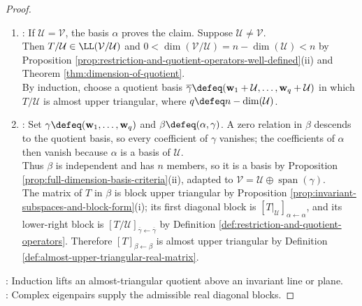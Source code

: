 \begin{theorem}
\begin{proof}
\begin{enumerate}[label=(\roman*)]
\begin{enumerate}[label=(\alph*)]
If $\mathbf{v}=c\mathbf{u}$ with $c\in\mathbb{R}$, then $c(a-bc)\mathbf{u}=cT\mathbf{u}=T\mathbf{v}=(b+ac)\mathbf{u}$ by linearity and the component identities.\\
Thus $c^2=-1$ by $\mathbf{u}\neq\mathbf{0}$ and $b\neq0$, a contradiction. Therefore $\mathbf{u},\mathbf{v}$ are independent.\\
Set $\mathcal{U}\defeq\operatorname{span}(\mathbf{u},\mathbf{v})$ and $\alpha\defeq(\mathbf{u},-\mathbf{v})$. Then $\mathcal{U}\in\operatorname{Inv}(T)$ and $[T|_{\mathcal{U}}]_{\alpha\leftarrow\alpha}=\left[\begin{smallmatrix}a&-b\\b&a\end{smallmatrix}\right]$ by the component identities.
\end{enumerate}
In both cases, $\dim(\mathcal{U})\in\{1,2\}$ and the matrix of $T|_{\mathcal{U}}$ in $\alpha$ is an admissible first diagonal block.
\item {}: If $\mathcal{U}=\mathcal{V}$, the basis $\alpha$ proves the claim. Suppose $\mathcal{U}\neq\mathcal{V}$.\\
Then $T/\mathcal{U}\in\LL(\mathcal{V}/\mathcal{U})$ and $0<\dim(\mathcal{V}/\mathcal{U})=n-\dim(\mathcal{U})<n$ by Proposition \ref{prop:restriction-and-quotient-operators-well-defined}(ii) and Theorem \ref{thm:dimension-of-quotient}.\\
By induction, choose a quotient basis $\overline{\gamma}\defeq(\mathbf{w}_1+\mathcal{U},\ldots,\mathbf{w}_q+\mathcal{U})$ in which $T/\mathcal{U}$ is almost upper triangular, where $q\defeq n-\dim(\mathcal{U})$.
\item {}: Set $\gamma\defeq(\mathbf{w}_1,\ldots,\mathbf{w}_q)$ and $\beta\defeq(\alpha,\gamma)$. A zero relation in $\beta$ descends to the quotient basis, so every coefficient of $\gamma$ vanishes; the coefficients of $\alpha$ then vanish because $\alpha$ is a basis of $\mathcal{U}$.\\
Thus $\beta$ is independent and has $n$ members, so it is a basis by Proposition \ref{prop:full-dimension-basis-criteria}(ii), adapted to $\mathcal{V}=\mathcal{U}\oplus\operatorname{span}(\gamma)$.\\
The matrix of $T$ in $\beta$ is block upper triangular by Proposition \ref{prop:invariant-subspaces-and-block-form}(i); its first diagonal block is $[T|_{\mathcal{U}}]_{\alpha\leftarrow\alpha}$, and its lower-right block is $[T/\mathcal{U}]_{\overline{\gamma}\leftarrow\overline{\gamma}}$ by Definition \ref{def:restriction-and-quotient-operators}. Therefore $[T]_{\beta\leftarrow\beta}$ is almost upper triangular by Definition \ref{def:almost-upper-triangular-real-matrix}.
\end{enumerate}
: Induction lifts an almost-triangular quotient above an invariant line or plane.\\
: Complex eigenpairs supply the admissible real diagonal blocks.
\end{proof}
\end{theorem}

